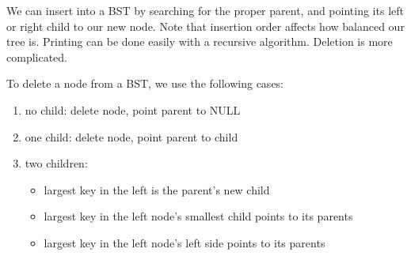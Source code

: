 \documentclass[12pt]{article}
\begin{document}
We can insert into a BST by searching for the proper parent, and pointing its left or right child to our new node. Note that insertion order affects how balanced our tree is. Printing can be done easily with a recursive algorithm. Deletion is more complicated.

To delete a node from a BST, we use the following cases:
\begin{enumerate}
\item no child: delete node, point parent to NULL
\item one child: delete node, point parent to child
\item two children:
\begin{itemize}
\item largest key in the left is the parent's new child
\item largest key in the left node's smallest child points to its parents
\item largest key in the left node's left side points to its parents
\end{itemize}
\end{enumerate}
\end{document}

